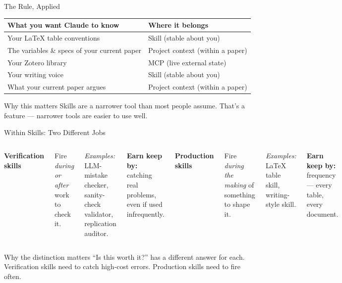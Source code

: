 \documentclass[aspectratio=169, 11pt]{beamer}
\begin{document}
\begin{frame}{The Rule, Applied}
  \small
  \begin{tabular}{@{}p{6.8cm} p{5.8cm}@{}}
    \toprule
    \textbf{What you want Claude to know} & \textbf{Where it belongs} \\
    \midrule
    Your \LaTeX{} table conventions & Skill (stable about you) \\[0.3em]
    The variables \& specs of your current paper & Project context (within a paper) \\[0.3em]
    Your Zotero library & MCP (live external state) \\[0.3em]
    Your writing voice & Skill (stable about you) \\[0.3em]
    What your current paper argues & Project context (within a paper) \\
    \bottomrule
  \end{tabular}

  \vspace{0.8em}
  \begin{block}{Why this matters}
    Skills are a narrower tool than most people assume. That's a feature --- narrower tools are easier to use well.
  \end{block}
\end{frame}


\begin{frame}{Within Skills: Two Different Jobs}
  \begin{columns}[T]
    \textbf{Verification skills}

    \vspace{0.3em}
    Fire \emph{during or after} work to check it.

    \vspace{0.3em}
    \textit{Examples:} LLM-mistake checker, sanity-check validator, replication auditor.

    \vspace{0.3em}
    \textbf{Earn keep by:} catching real problems, even if used infrequently.

    \textbf{Production skills}

    \vspace{0.3em}
    Fire \emph{during the making} of something to shape it.

    \vspace{0.3em}
    \textit{Examples:} \LaTeX{} table skill, writing-style skill.

    \vspace{0.3em}
    \textbf{Earn keep by:} frequency --- every table, every document.
  \end{columns}

  \vspace{0.8em}
  \begin{alertblock}{Why the distinction matters}
    ``Is this worth it?'' has a different answer for each. Verification skills need to catch high-cost errors. Production skills need to fire often.
  \end{alertblock}
\end{frame}
\end{document}
